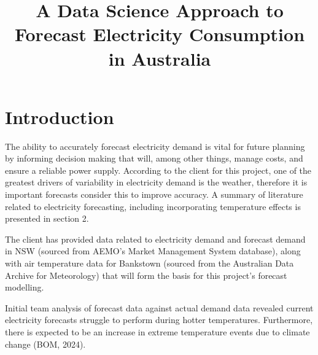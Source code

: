 \documentclass[mstat,12pt,a4paper]{unswthesis}
\title{A Data Science Approach to Forecast Electricity Consumption in
Australia}
\author{\Authornameonly}
\begin{document}
\beforepreface










\afterpreface





%
%






\chapter{Introduction}\label{introduction}

The ability to accurately forecast electricity demand is vital for
future planning by informing decision making that will, among other
things, manage costs, and ensure a reliable power supply. According to
the client for this project, one of the greatest drivers of variability
in electricity demand is the weather, therefore it is important
forecasts consider this to improve accuracy. A summary of literature
related to electricity forecasting, including incorporating temperature
effects is presented in section 2.

\bigskip

The client has provided data related to electricity demand and forecast
demand in NSW (sourced from AEMO's Market Management System database),
along with air temperature data for Bankstown (sourced from the
Australian Data Archive for Meteorology) that will form the basis for
this project's forecast modelling.

\bigskip

Initial team analysis of forecast data against actual demand data
revealed current electricity forecasts struggle to perform during hotter
temperatures. Furthermore, there is expected to be an increase in
extreme temperature events due to climate change (BOM, 2024).

\bigskip
\end{document}
